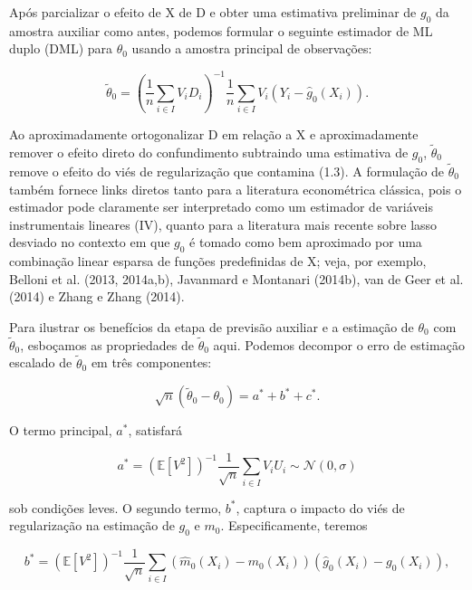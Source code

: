 \documentclass[a4paper,12pt]{article}[abntex2]
\begin{document}
Após parcializar o efeito de X de D e obter uma estimativa preliminar de $g_0$ da amostra auxiliar como antes, podemos formular o seguinte estimador de ML duplo (DML) para $\theta_0$ usando a amostra principal de observações:

\begin{equation}
\tilde{\theta}_0 = \left(\frac{1}{n} \sum_{i \in I} V_i D_i \right)^{-1} \frac{1}{n} \sum_{i \in I} V_i (Y_i - \hat{g}_0(X_i)).
\end{equation}

Ao aproximadamente ortogonalizar D em relação a X e aproximadamente remover o efeito direto do confundimento subtraindo uma estimativa de $g_0$, $\tilde{\theta}_0$ remove o efeito do viés de regularização que contamina (1.3). A formulação de $\tilde{\theta}_0$ também fornece links diretos tanto para a literatura econométrica clássica, pois o estimador pode claramente ser interpretado como um estimador de variáveis instrumentais lineares (IV), quanto para a literatura mais recente sobre lasso desviado no contexto em que $g_0$ é tomado como bem aproximado por uma combinação linear esparsa de funções predefinidas de X; veja, por exemplo, Belloni et al. (2013, 2014a,b), Javanmard e Montanari (2014b), van de Geer et al. (2014) e Zhang e Zhang (2014).

Para ilustrar os benefícios da etapa de previsão auxiliar e a estimação de $\theta_0$ com $\tilde{\theta}_0$, esboçamos as propriedades de $\tilde{\theta}_0$ aqui. Podemos decompor o erro de estimação escalado de $\tilde{\theta}_0$ em três componentes:

\begin{equation}
\sqrt{n}(\tilde{\theta}_0 - \theta_0) = a^* + b^* + c^*.
\end{equation}

O termo principal, $a^*$, satisfará

\begin{equation}
a^* = \left(\mathbb{E}[V^2]\right)^{-1} \frac{1}{\sqrt{n}} \sum_{i \in I} V_i U_i \sim \mathcal{N}(0, \sigma)
\end{equation}

sob condições leves. O segundo termo, $b^*$, captura o impacto do viés de regularização na estimação de $g_0$ e $m_0$. Especificamente, teremos

\begin{equation}
b^* = \left(\mathbb{E}[V^2]\right)^{-1} \frac{1}{\sqrt{n}} \sum_{i \in I} (\hat{m}_0(X_i) - m_0(X_i)) (\hat{g}_0(X_i) - g_0(X_i)),
\end{equation}
\end{document}
